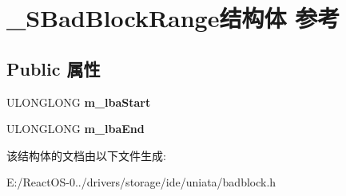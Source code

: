 \hypertarget{struct___s_bad_block_range}{}\section{\+\_\+\+S\+Bad\+Block\+Range结构体 参考}
\label{struct___s_bad_block_range}
\subsection*{Public 属性}
\begin{DoxyCompactItemize}
\item 
\mbox{\label{struct___s_bad_block_range_ae3a686aa6d0f2e677b622415e77a21f0}} 
U\+L\+O\+N\+G\+L\+O\+NG {\bfseries m\+\_\+lba\+Start}
\item 
\mbox{\label{struct___s_bad_block_range_a0321a7d8f931ee251ee647b9845ba849}} 
U\+L\+O\+N\+G\+L\+O\+NG {\bfseries m\+\_\+lba\+End}
\end{DoxyCompactItemize}


该结构体的文档由以下文件生成\+:\begin{DoxyCompactItemize}
\item 
E\+:/\+React\+O\+S-\/0../drivers/storage/ide/uniata/badblock.\+h\end{DoxyCompactItemize}
